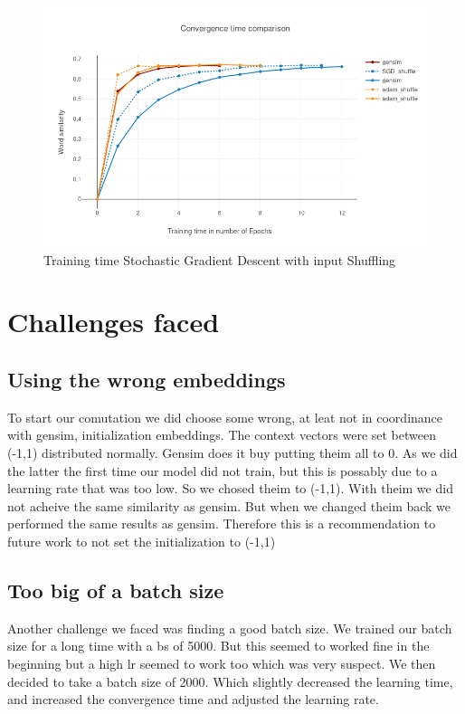 \begin{figure}[h]
    \centering
			\includegraphics[scale=0.45]{images/gensim_vs_adam} 
    \caption{Training time Stochastic Gradient Descent with input Shuffling}
    \label{fig:gensim_vs_adam}
\end{figure}


\section{Challenges faced}
\subsection{Using the wrong embeddings}
To start our comutation we did choose some wrong, at leat not in coordinance with gensim, initialization embeddings. The context vectors were set between (-1,1) distributed normally. Gensim does it buy putting theim all to 0. As we did the latter the first time our model did not train, but this is possably due to a learning rate that was too low. So we chosed theim to (-1,1). With theim we did not acheive the same similarity as gensim. But when we changed theim back we performed the same results as gensim. Therefore this is a recommendation to future work to not set the initialization to (-1,1)
\subsection{Too big of a batch size}
Another challenge we faced was finding a good batch size. We trained our batch size for a long time with a bs of 5000. But this seemed to worked fine in the beginning but a high lr seemed to work too which was very suspect. We then decided to take a batch size of 2000. Which slightly decreased the learning time, and increased the convergence time and adjusted the learning rate. 
